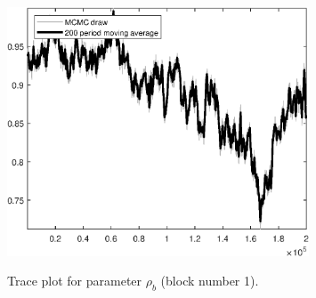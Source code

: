 \begin{figure}[H]
\centering
  \includegraphics[width=0.8\textwidth]{BRS_sectoral_rest/graphs/TracePlot_rho_b_blck_1}\\
    \caption{Trace plot for parameter ${\rho_b}$ (block number 1).}
\end{figure}
